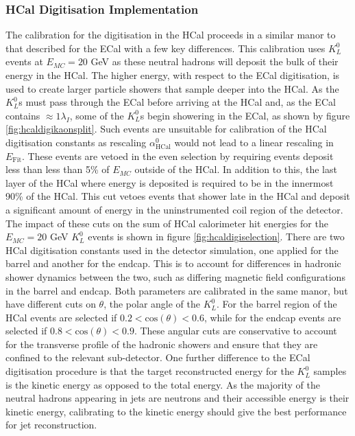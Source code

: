 
\subsubsection{HCal Digitisation Implementation}
\label{sec:hcaldigi}
The calibration for the digitisation in the HCal proceeds in a similar manor to that described for the ECal with a few key differences.  This calibration uses $K^{0}_{L}$ events at $E_{MC} = 20$ GeV as these neutral hadrons will deposit the bulk of their energy in the HCal.  The higher energy, with respect to the ECal digitisation, is used to create larger particle showers that sample deeper into the HCal.  As the $K^{0}_{L}$s must pass through the ECal before arriving at the HCal and, as the ECal contains $\approx 1 \lambda_{I}$, some of the $K^{0}_{L}$s begin showering in the ECal, as shown by figure \ref{fig:hcaldigikaonsplit}.  Such events are unsuitable for calibration of the HCal digitisation constants as rescaling $\alpha^{0}_{\text{HCal}}$ would not lead to a linear rescaling in $E_{\text{Fit}}$.  These events are vetoed in the even selection by requiring events deposit less than less than 5\% of $E_{MC}$ outside of the HCal.  In addition to this, the last layer of the HCal where energy is deposited is required to be in the innermost 90\% of the HCal.  This cut vetoes events that shower late in the HCal and deposit a significant amount of energy in the uninstrumented coil region of the detector.  The impact of these cuts on the sum of HCal calorimeter hit energies for the $E_{MC} = 20$ GeV $K^{0}_{L}$ events is shown in figure \ref{fig:hcaldigiselection}.  There are two HCal digitisation constants used in the detector simulation, one applied for the barrel and another for the endcap.  This is to account for differences in hadronic shower dynamics between the two, such as differing magnetic field configurations in the barrel and endcap.  Both parameters are calibrated in the same manor, but have different cuts on $\theta$, the polar angle of the $K^{0}_{L}$.  For the barrel region of the HCal events are selected if $0.2 < \text{cos}(\theta) < 0.6$, while for the endcap events are selected if $0.8 < \text{cos}(\theta) < 0.9$.  These angular cuts are conservative to account for the transverse profile of the hadronic showers and ensure that they are confined to the relevant sub-detector.  One further difference to the ECal digitisation procedure is that the target reconstructed energy for the $K^{0}_{L}$ samples is the kinetic energy as opposed to the total energy.  As the majority of the neutral hadrons appearing in jets are neutrons and their accessible energy is their kinetic energy, calibrating to the kinetic energy should give the best performance for jet reconstruction.  

